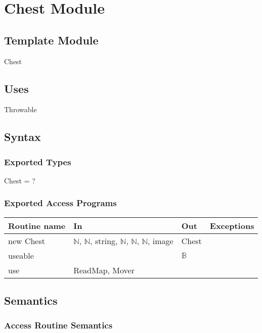 \documentclass[12pt]{article}
\begin{document}
\newpage

\section*{Chest Module}

\subsection*{Template Module}

Chest

\subsection*{Uses}

Throwable

\subsection*{Syntax}

\subsubsection*{Exported Types}

Chest = ?

\subsubsection*{Exported Access Programs}

\begin{tabular}{| l | l | l | l |}
\hline
\textbf{Routine name} & \textbf{In} & \textbf{Out} & \textbf{Exceptions}\\
\hline
new Chest & $\mathbb{N}$, $\mathbb{N}$, string, $\mathbb{N}$, $\mathbb{N}$, $\mathbb{N}$, image & Chest & ~\\
\hline
useable & ~ & $\mathbb{B}$ & ~\\
\hline
use & ReadMap, Mover & ~ & ~\\
\hline
\end{tabular}

\subsection*{Semantics}

\subsubsection*{Access Routine Semantics}
\end{document}
